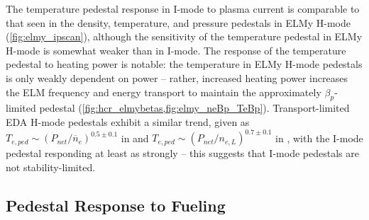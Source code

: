 \begin{figure}
 \pushtooutside
\end{figure}

The temperature pedestal response in I-mode to plasma current is comparable to that seen in the density, temperature, and pressure pedestals in ELMy H-mode (\cf \cref{fig:elmy_ipscan}), although the sensitivity of the temperature pedestal in ELMy H-mode is somewhat weaker than in I-mode.  The response of the temperature pedestal to heating power is notable: the temperature in ELMy H-mode pedestals is only weakly dependent on power -- rather, increased heating power increases the ELM frequency and energy transport to maintain the approximately $\beta_p$-limited pedestal (\cf \cref{fig:hcr_elmybetas,fig:elmy_neBp_TeBp}).  Transport-limited EDA H-mode pedestals exhibit a similar trend, given as $T_{e,ped} \sim \left(P_{net}/\overline{n}_e\right)^{0.5 \pm 0.1}$ in \cite{Hubbard2001} and $T_{e,ped} \sim \left(P_{net}/n_{e,L}\right)^{0.7 \pm 0.1}$ in \cite{Hughes2002}, with the I-mode pedestal responding at least as strongly -- this suggests that I-mode pedestals are not stability-limited. 

\subsection{Pedestal Response to Fueling}\label{subsec:imode_fueling}

